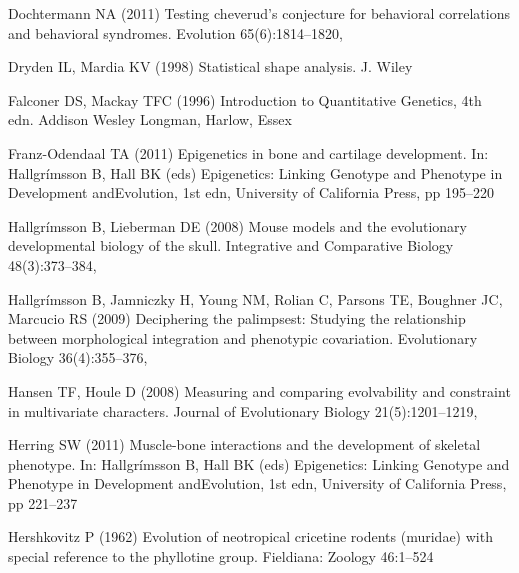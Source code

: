 \documentclass [twocolumn, natbib, nospthms, 10pt] {svjour3}
\begin{document}
\begin{thebibliography}{77}
Dochtermann NA (2011) Testing cheverud's conjecture for behavioral correlations
  and behavioral syndromes. Evolution 65(6):1814–1820,

Dryden IL, Mardia KV (1998) Statistical shape analysis. J. Wiley

Falconer DS, Mackay TFC (1996) Introduction to Quantitative Genetics, 4th edn.
  Addison Wesley Longman, Harlow, Essex

Franz-Odendaal TA (2011) Epigenetics in bone and cartilage development. In:
  Hallgrímsson B, Hall BK (eds) Epigenetics: Linking Genotype and Phenotype in
  Development {andEvolution}, 1st edn, University of California Press, pp
  195--220

Hallgrímsson B, Lieberman DE (2008) Mouse models and the evolutionary
  developmental biology of the skull. Integrative and Comparative Biology
  48(3):373–384, 

Hallgrímsson B, Jamniczky H, Young NM, Rolian C, Parsons TE, Boughner JC,
  Marcucio RS (2009) Deciphering the palimpsest: Studying the relationship
  between morphological integration and phenotypic covariation. Evolutionary
  Biology 36(4):355–376, 

Hansen TF, Houle D (2008) Measuring and comparing evolvability and constraint
  in multivariate characters. Journal of Evolutionary Biology
  21(5):1201–1219, 

Herring SW (2011) Muscle-bone interactions and the development of skeletal
  phenotype. In: Hallgrímsson B, Hall BK (eds) Epigenetics: Linking Genotype
  and Phenotype in Development {andEvolution}, 1st edn, University of
  California Press, pp 221--237

Hershkovitz P (1962) Evolution of neotropical cricetine rodents (muridae) with
  special reference to the phyllotine group. Fieldiana: Zoology 46:1–524


\end{thebibliography}
\end{document}
